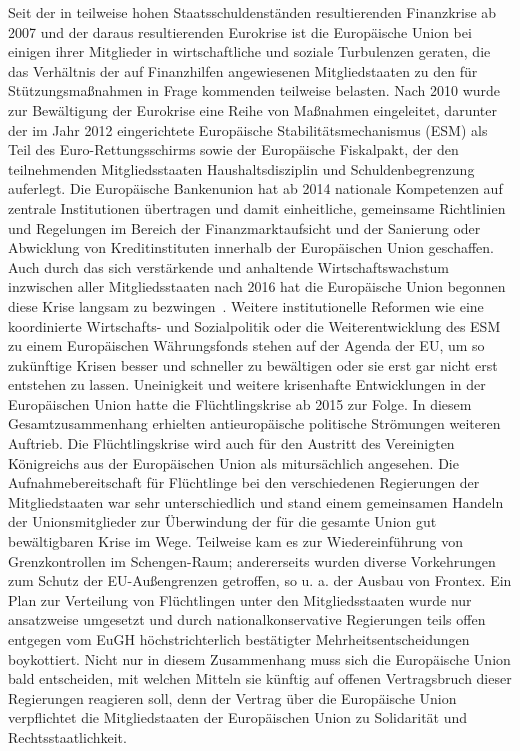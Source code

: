 Seit der in teilweise hohen Staatsschuldenständen resultierenden Finanzkrise ab 2007 und der daraus resultierenden Eurokrise ist die Europäische Union bei einigen ihrer Mitglieder in wirtschaftliche und soziale Turbulenzen geraten, die das Verhältnis der auf Finanzhilfen angewiesenen Mitgliedstaaten zu den für Stützungsmaßnahmen in Frage kommenden teilweise belasten. Nach 2010 wurde zur Bewältigung der Eurokrise eine Reihe von Maßnahmen eingeleitet, darunter der im Jahr 2012 eingerichtete Europäische Stabilitätsmechanismus (ESM) als Teil des Euro-Rettungsschirms sowie der Europäische Fiskalpakt, der den teilnehmenden Mitgliedsstaaten Haushaltsdisziplin und Schuldenbegrenzung auferlegt. Die Europäische Bankenunion hat ab 2014 nationale Kompetenzen auf zentrale Institutionen übertragen und damit einheitliche, gemeinsame Richtlinien und Regelungen im Bereich der Finanzmarktaufsicht und der Sanierung oder Abwicklung von Kreditinstituten innerhalb der Europäischen Union geschaffen. Auch durch das sich verstärkende und anhaltende Wirtschaftswachstum inzwischen aller Mitgliedsstaaten nach 2016 hat die Europäische Union begonnen diese Krise langsam zu bezwingen~\cite{euroKrise}. Weitere institutionelle Reformen wie eine koordinierte Wirtschafts- und Sozialpolitik oder die Weiterentwicklung des ESM zu einem Europäischen Währungsfonds stehen auf der Agenda der EU, um so zukünftige Krisen besser und schneller zu bewältigen oder sie erst gar nicht erst entstehen zu lassen.
\newline
Uneinigkeit und weitere krisenhafte Entwicklungen in der Europäischen Union hatte die Flüchtlingskrise ab 2015 zur Folge. In diesem Gesamtzusammenhang erhielten antieuropäische politische Strömungen weiteren Auftrieb. Die Flüchtlingskrise wird auch für den Austritt des Vereinigten Königreichs aus der Europäischen Union als mitursächlich angesehen. Die Aufnahmebereitschaft für Flüchtlinge bei den verschiedenen Regierungen der Mitgliedstaaten war sehr unterschiedlich und stand einem gemeinsamen Handeln der Unionsmitglieder zur Überwindung der für die gesamte Union gut bewältigbaren Krise im Wege. Teilweise kam es zur Wiedereinführung von Grenzkontrollen im Schengen-Raum; andererseits wurden diverse Vorkehrungen zum Schutz der EU-Außengrenzen getroffen, so u. a. der Ausbau von Frontex. Ein Plan zur Verteilung von Flüchtlingen unter den Mitgliedsstaaten wurde nur ansatzweise umgesetzt und durch nationalkonservative Regierungen teils offen entgegen vom EuGH höchstrichterlich bestätigter Mehrheitsentscheidungen boykottiert. Nicht nur in diesem Zusammenhang muss sich die Europäische Union bald entscheiden, mit welchen Mitteln sie künftig auf offenen Vertragsbruch dieser Regierungen reagieren soll, denn der Vertrag über die Europäische Union verpflichtet die Mitgliedstaaten der Europäischen Union zu Solidarität und Rechtsstaatlichkeit.\newline
